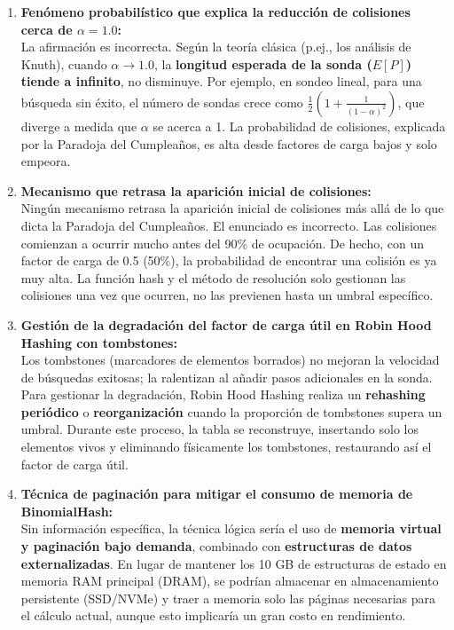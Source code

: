 \documentclass[12pt,a4paper]{report}
\begin{document}
\begin{enumerate}
    \item \textbf{Fenómeno probabilístico que explica la reducción de colisiones cerca de $\alpha = 1.0$:}\\
    La afirmación es incorrecta. Según la teoría clásica (p.ej., los análisis de Knuth), cuando $\alpha \to 1.0$, la \textbf{longitud esperada de la sonda ($E[P]$) tiende a infinito}, no disminuye. Por ejemplo, en sondeo lineal, para una búsqueda sin éxito, el número de sondas crece como $\frac{1}{2}(1 + \frac{1}{(1-\alpha)^2})$, que diverge a medida que $\alpha$ se acerca a 1. La probabilidad de colisiones, explicada por la Paradoja del Cumpleaños, es alta desde factores de carga bajos y solo empeora.
    \item \textbf{Mecanismo que retrasa la aparición inicial de colisiones:}\\
    Ningún mecanismo retrasa la aparición inicial de colisiones más allá de lo que dicta la Paradoja del Cumpleaños. El enunciado es incorrecto. Las colisiones comienzan a ocurrir mucho antes del 90\% de ocupación. De hecho, con un factor de carga de 0.5 (50\%), la probabilidad de encontrar una colisión es ya muy alta. La función hash y el método de resolución solo gestionan las colisiones una vez que ocurren, no las previenen hasta un umbral específico.
    \item \textbf{Gestión de la degradación del factor de carga útil en Robin Hood Hashing con tombstones:}\\
    Los tombstones (marcadores de elementos borrados) no mejoran la velocidad de búsquedas exitosas; la ralentizan al añadir pasos adicionales en la sonda. Para gestionar la degradación, Robin Hood Hashing realiza un \textbf{rehashing periódico} o \textbf{reorganización} cuando la proporción de tombstones supera un umbral. Durante este proceso, la tabla se reconstruye, insertando solo los elementos vivos y eliminando físicamente los tombstones, restaurando así el factor de carga útil.
    \item \textbf{Técnica de paginación para mitigar el consumo de memoria de BinomialHash:}\\
    Sin información específica, la técnica lógica sería el uso de \textbf{memoria virtual y paginación bajo demanda}, combinado con \textbf{estructuras de datos externalizadas}. En lugar de mantener los 10 GB de estructuras de estado en memoria RAM principal (DRAM), se podrían almacenar en almacenamiento persistente (SSD/NVMe) y traer a memoria solo las páginas necesarias para el cálculo actual, aunque esto implicaría un gran costo en rendimiento.

\end{enumerate}
\end{document}
